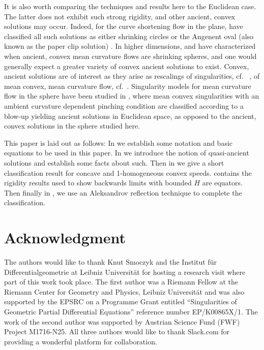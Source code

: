 \documentclass{amsart}
\begin{document}
It is also worth comparing the techniques and results here to the Euclidean case. The latter does not exhibit such strong rigidity, and other ancient, convex solutions may occur. Indeed, for the curve shortening flow in the plane, \cite{DaskalopoulosHamiltonSesum:2010} have classified all such solutions as either shrinking circles or the Angenent oval (also known as the paper clip solution) \cite{Angenent:1992}. In higher dimensions, \cite{HuiskenSinestrari:05/2014} and \cite{HaslhoferHershkovits:08/2013} have characterized when ancient, convex mean curvature flows are shrinking spheres, and one would generally expect a greater variety of convex ancient solutions to exist. Convex, ancient solutions are of interest as they arise as rescalings of singularities, cf.~ \cite{HuiskenSinestrari:01/1999}, of mean convex, mean curvature flow, cf.~\cite{HuiskenSinestrari:09/1999, White:10/2002}. Singularity models for mean curvature flow in the sphere have been studied in \cite{Nguyen:2015}, where mean convex singularities with an ambient curvature dependent pinching condition are classified according to a blow-up yielding ancient solutions in Euclidean space, as opposed to the ancient, convex solutions in the sphere studied here.

This paper is laid out as follows: In  we establish some notation and basic equations to be used in this paper. In  we introduce the notion of quasi-ancient solutions and establish some facts about such. Then in  we give a short classification result for concave and 1-homogeneous convex speeds.  contains the rigidity results used to show backwards limits with bounded \(H\) are equators. Then finally in , we use an Aleksandrov reflection technique to complete the classification.

\section*{Acknowledgment}
The authors would like to thank Knut Smoczyk and the Institut f\"{u}r Differentialgeometrie at Leibniz Universität for hosting a research visit where part of this work took place. The first author was a Riemann Fellow at the Riemann Center for Geometry and Physics, Leibniz Universit\"{a}t and was also supported by the EPSRC on a Programme Grant entitled ``Singularities of Geometric Partial Differential Equations'' reference number EP/K00865X/1. The work of the second author was supported by Austrian Science Fund (FWF) Project M1716-N25. All three authors would like to thank Slack.com for providing a wonderful platform for collaboration. 
\end{document}
